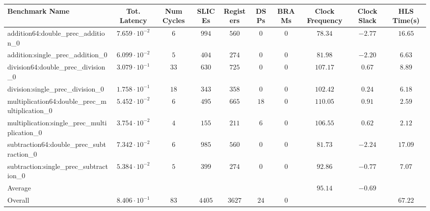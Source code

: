 \begin{tabular}{|l|c|c|c|c|c|c|c|c|c|}
\hline
Benchmark Name                                   & Tot. Latency            & Num Cycles & SLICEs   & Registers & DSPs   & BRAMs & Clock Frequency & Clock Slack & HLS Time(s) \\
\hline
addition64:double\_prec\_addition\_0             & $ 7.659 \cdot 10^{-2} $ & $ 6      $ & $ 994  $ & $ 560   $ & $ 0  $ & $ 0 $ & $ 78.34       $ & $ -2.77   $ & $ 16.65   $ \\
addition:single\_prec\_addition\_0               & $ 6.099 \cdot 10^{-2} $ & $ 5      $ & $ 404  $ & $ 274   $ & $ 0  $ & $ 0 $ & $ 81.98       $ & $ -2.20   $ & $ 6.63    $ \\
division64:double\_prec\_division\_0             & $ 3.079 \cdot 10^{-1} $ & $ 33     $ & $ 630  $ & $ 725   $ & $ 0  $ & $ 0 $ & $ 107.17      $ & $ 0.67    $ & $ 8.89    $ \\
division:single\_prec\_division\_0               & $ 1.758 \cdot 10^{-1} $ & $ 18     $ & $ 343  $ & $ 358   $ & $ 0  $ & $ 0 $ & $ 102.42      $ & $ 0.24    $ & $ 6.18    $ \\
multiplication64:double\_prec\_multiplication\_0 & $ 5.452 \cdot 10^{-2} $ & $ 6      $ & $ 495  $ & $ 665   $ & $ 18 $ & $ 0 $ & $ 110.05      $ & $ 0.91    $ & $ 2.59    $ \\
multiplication:single\_prec\_multiplication\_0   & $ 3.754 \cdot 10^{-2} $ & $ 4      $ & $ 155  $ & $ 211   $ & $ 6  $ & $ 0 $ & $ 106.55      $ & $ 0.62    $ & $ 2.12    $ \\
subtraction64:double\_prec\_subtraction\_0       & $ 7.342 \cdot 10^{-2} $ & $ 6      $ & $ 985  $ & $ 560   $ & $ 0  $ & $ 0 $ & $ 81.73       $ & $ -2.24   $ & $ 17.09   $ \\
subtraction:single\_prec\_subtraction\_0         & $ 5.384 \cdot 10^{-2} $ & $ 5      $ & $ 399  $ & $ 274   $ & $ 0  $ & $ 0 $ & $ 92.86       $ & $ -0.77   $ & $ 7.07    $ \\
\hline
Average                                          & $                     $ & $        $ & $      $ & $       $ & $    $ & $   $ & $ 95.14       $ & $ -0.69   $ & $         $ \\
\hline
Overall                                          & $ 8.406 \cdot 10^{-1} $ & $ 83     $ & $ 4405 $ & $ 3627  $ & $ 24 $ & $ 0 $ & $             $ & $         $ & $ 67.22   $ \\
\hline
\end{tabular}
